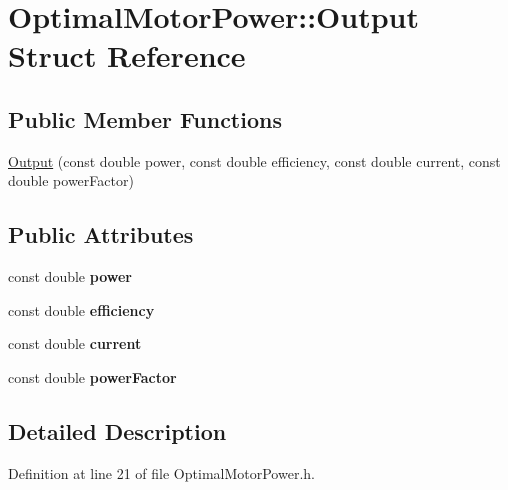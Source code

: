 \hypertarget{struct_optimal_motor_power_1_1_output}{}\section{Optimal\+Motor\+Power\+:\+:Output Struct Reference}
\label{struct_optimal_motor_power_1_1_output}
\subsection*{Public Member Functions}
\begin{DoxyCompactItemize}
\item 
\hyperlink{struct_optimal_motor_power_1_1_output_a5e92ac0f5568c3a043ef19c2ab631d09}{Output} (const double power, const double efficiency, const double current, const double power\+Factor)
\end{DoxyCompactItemize}
\subsection*{Public Attributes}
\begin{DoxyCompactItemize}
\item 
\mbox{\label{struct_optimal_motor_power_1_1_output_a2848225247934e5029fe3748e9c96682}} 
const double {\bfseries power}
\item 
\mbox{\label{struct_optimal_motor_power_1_1_output_ae7a0621dd6230bd92ebcba7ce81b12c6}} 
const double {\bfseries efficiency}
\item 
\mbox{\label{struct_optimal_motor_power_1_1_output_ae096d9691f71779d58f3f17e7faf5c00}} 
const double {\bfseries current}
\item 
\mbox{\label{struct_optimal_motor_power_1_1_output_aa02432d4d75c11c7e0050546d6f8d92c}} 
const double {\bfseries power\+Factor}
\end{DoxyCompactItemize}


\subsection{Detailed Description}


Definition at line 21 of file Optimal\+Motor\+Power.\+h.



